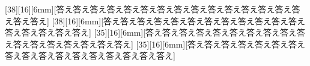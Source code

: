 \documentclass[8pt,b5paper,twoside]{ltjtreport}
\begin{document}
[38][16][6mm][答え答え答え答え答え答え答え答え答え答え答え答え答え答え答え答え答え]
\vskip0pt
[38][16][6mm][答え答え答え答え答え答え答え答え答え答え答え答え答え答え答え答え答え]
\vskip0pt
[35][16][6mm][答え答え答え答え答え答え答え答え答え答え答え答え答え答え答え答え答え]
\vskip0pt
[35][16][6mm][答え答え答え答え答え答え答え答え答え答え答え答え答え答え答え答え答え]
\end{document}
